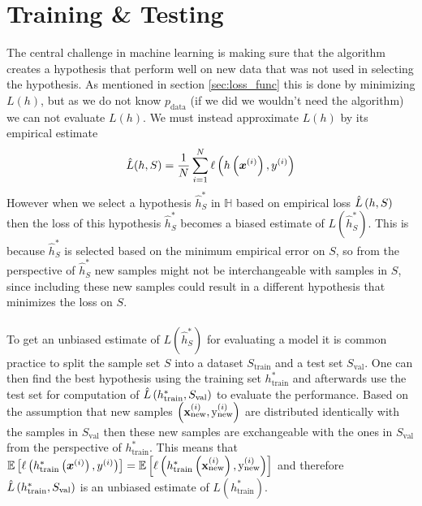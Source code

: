 \section{Training \& Testing} \label{sec:train_val}
The central challenge in machine learning is making sure that the algorithm creates a hypothesis that perform well on new data that was not used in selecting the hypothesis. As mentioned in section \ref{sec:loss_func} this is done by minimizing $L(h)$, but as we do not know $p_\text{data}$ (if we did we wouldn't need the algorithm) we can not evaluate $L(h)$. We must instead approximate $L(h)$ by its empirical estimate 
\begin{equation*}
    \hat{L}(h,S)= \frac{1}{N} \sum_{i=1}^N \ell \left (h\left (\boldsymbol{x}^{(i)}\right), y^{(i)}\right)
\end{equation*}
However when we select a hypothesis $\hat{h}^*_S$ in $\mathbb{H}$ based on empirical loss $\hat{L} \left (h, S\right)$ then the loss of this hypothesis $\hat{h}^*_S$ becomes a biased estimate of $L(\hat{h}^*_S)$. This is because $\hat{h}^*_S$ is selected based on the minimum empirical error on $S$, so from the perspective of $\hat{h}^*_S$ new samples might not be interchangeable with samples in $S$, since including these new samples could result in a different hypothesis that minimizes the loss on $S$. \\
\\
To get an unbiased estimate of $L(\hat{h}^*_S)$ for evaluating a model it is common practice to split the sample set $S$ into a dataset $S_\text{train}$ and a test set $S_\text{val}$. One can then find the best hypothesis using the training set $h^*_\text{train}$ and afterwards use the test set for computation of $\hat{L}\left (h^*_\text{train}, S_\text{val}\right)$ to evaluate the performance. Based on the assumption that new samples $\left (\mathbf{x}^{(i)}_{\text{new}}, \text{y}^{(i)}_{\text{new}}\right)$ are distributed identically with the samples in $S_\text{val}$ then these new samples are exchangeable with the ones in $S_\text{val}$ from the perspective of $h^*_\text{train}$. This means that $\E \lrs{\ell \lr{h^*_\text{train} \lr{\boldsymbol{x}^{(i)}}, y^{(i)}}} = \E \lrs{\ell \lr{h^*_\text{train} \lr{\mathbf{x}^{(i)}_{\text{new}}}, \text{y}_{\text{new}}^{(i)}}}$ and therefore $\hat{L}\left (h^*_\text{train}, S_\text{val}\right)$ is an unbiased estimate of $L(h^*_\text{train})$.

